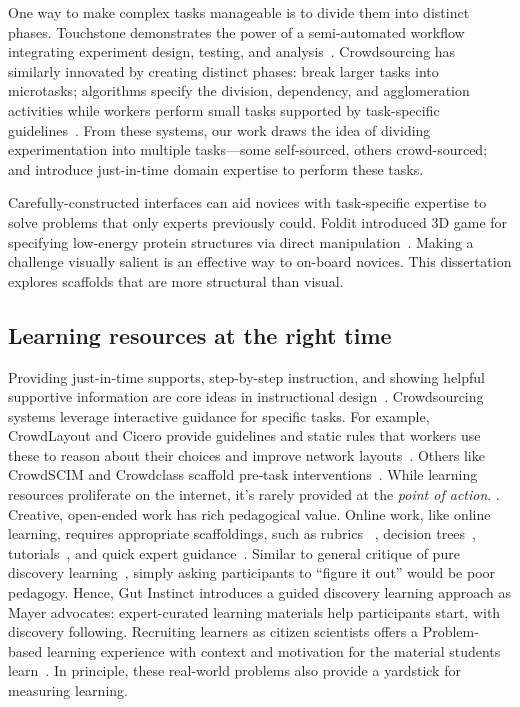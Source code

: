 One way to make complex tasks manageable is to divide them into distinct phases. 
Touchstone demonstrates the power of a semi-automated workflow integrating experiment 
design, testing, and analysis~\cite{Mackay2007}. Crowdsourcing has similarly innovated by 
creating distinct phases: break larger tasks into microtasks; algorithms specify the division, 
dependency, and agglomeration activities while workers perform small tasks supported by 
task-specific guidelines~\cite{lasecki2012real}. From these systems, our work draws the 
idea of dividing experimentation into multiple tasks—some self-sourced, others 
crowd-sourced; and introduce just-in-time domain expertise to perform these tasks. 

Carefully-constructed interfaces can aid novices with task-specific expertise to solve problems 
that only experts previously could. Foldit introduced 3D game for specifying low-energy protein 
structures via direct manipulation~\cite{Cooper2010}. Making a challenge visually salient is an 
effective way to on-board novices. This dissertation explores scaffolds that are more structural than visual.

\subsection{Learning resources at the right time}
Providing just-in-time supports, step-by-step instruction, and showing helpful supportive
 information are core ideas in instructional design~\cite{Kirschner2008}. Crowdsourcing 
systems leverage interactive guidance for specific tasks. For example, CrowdLayout and 
Cicero provide guidelines and static rules that workers use these to reason about their choices
 and improve network layouts~\cite{chen2019cicero, Singh:2018:CCD:3173574.3173806}. 
Others like CrowdSCIM and Crowdclass scaffold pre-task interventions~\cite{Lee2016,wang2018exploring}. 
While learning resources proliferate on the internet, it's rarely provided at the \textit{point of action}. 
.
Creative, open-ended work has rich pedagogical value. Online work, like 
online learning, requires appropriate scaffoldings, such as rubrics
~\cite{Boud1995, Kulkarni2013peer}, decision trees~\cite{Lee2016,Yu2006}, 
tutorials~\cite{Andersen2012}, and quick expert guidance~\cite{dow2012shepherding}. 
Similar to general critique of pure discovery learning~\cite{Mayer2004}, simply 
asking participants to “figure it out” would be poor pedagogy. Hence, Gut Instinct 
introduces a guided discovery learning approach as Mayer advocates: expert-curated 
learning materials help participants start, with discovery following. Recruiting learners
 as citizen scientists offers a Problem-based learning experience with context and 
motivation for the material students learn~\cite{Savery1995}. In principle, these 
real-world problems also provide a yardstick for measuring learning. 

